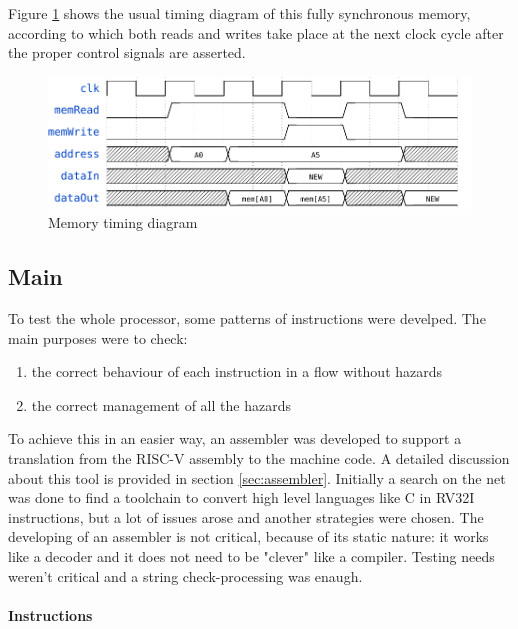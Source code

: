 \documentclass[a4paper]{article}
\begin{document}
Figure \ref{fig:memory_timing} shows the usual timing diagram of this fully synchronous memory, according to which both reads and writes take place at the next clock cycle after the proper control signals are asserted.

\begin{figure}[hbtp]
    \centering
    \includegraphics[scale=.8]{../memory/ref/timing/memory_timing.pdf}
    \caption{Memory timing diagram}
    \label{fig:memory_timing}
\end{figure}

\subsection{Main}\label{sec:main}
To test the whole processor, some patterns of instructions were develped. The main purposes were to check:
\begin{enumerate}
\item the correct behaviour of each instruction in a flow without hazards
\item the correct management of all the hazards
\end{enumerate}
To achieve this in an easier way, an assembler was developed to support a translation from the RISC-V assembly to the machine code. A detailed discussion about this tool is provided in section \ref{sec:assembler}. Initially a search on the net was done to find a toolchain to convert high level languages like C in RV32I instructions, but a lot of issues arose and another strategies were chosen. The developing of an assembler is not critical, because of its static nature: it works like a decoder and it does not need to be "clever" like a compiler. Testing needs weren't critical and a string check-processing was enaugh. 

\paragraph{Instructions}
\end{document}
